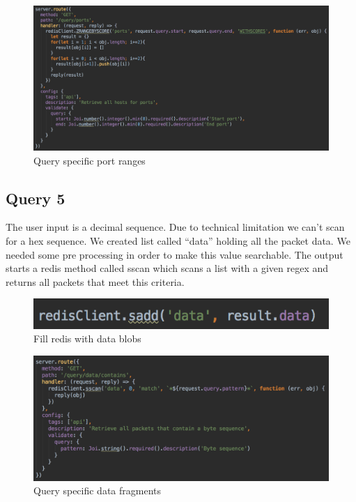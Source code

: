 \begin{figure}[htb!]
	\centerline{\includegraphics[width=1.0\textwidth]{resources/solution2-9.png}}
	\caption{Query specific port ranges}
	\label{query44}
\end{figure}

\subsection{Query 5}
The user input is a decimal sequence. Due to technical limitation we can’t scan for a hex sequence. We created list called “data” holding all the packet data. We needed some pre processing in order to make this value searchable. The output starts a redis method called sscan which scans a list with a given regex and returns all packets that meet this criteria.

  \begin{figure}[htb!]
	\centerline{\includegraphics[width=1.0\textwidth]{resources/solution2-10.png}}
	\caption{Fill redis with data blobs}
	\label{query5}
\end{figure}

\begin{figure}[htb!]
	\centerline{\includegraphics[width=1.0\textwidth]{resources/solution2-11.png}}
	\caption{Query specific data fragments}
	\label{query55}
\end{figure}

